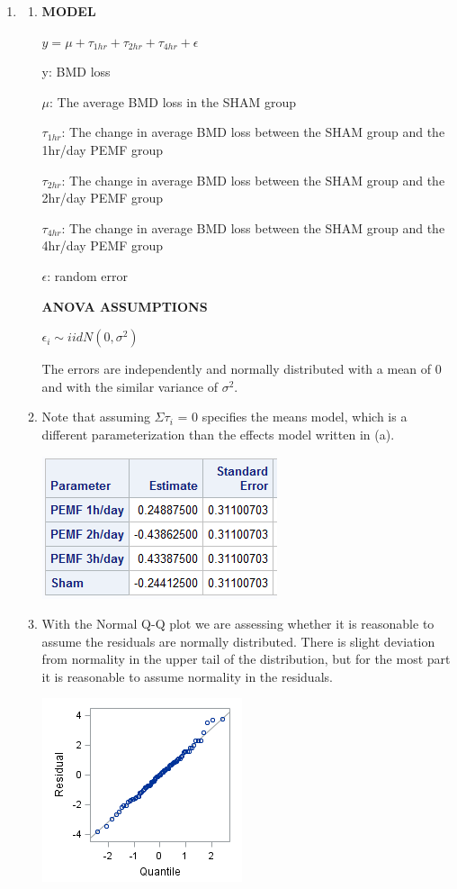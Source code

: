 \documentclass{article}\usepackage[]{graphicx}\usepackage[]{color}
\begin{document}
\begin{enumerate}
\newpage

\item %
\begin{enumerate}
\item %

{\bf MODEL}

$y = \mu + \tau_{1hr} + \tau_{2hr} + \tau_{4hr} + \epsilon$

y: BMD loss

$\mu$: The average BMD loss in the SHAM group

$\tau_{1hr}$: The change in average BMD loss between the SHAM group and the 1hr/day PEMF group

$\tau_{2hr}$: The change in average BMD loss between the SHAM group and the 2hr/day PEMF group

$\tau_{4hr}$: The change in average BMD loss between the SHAM group and the 4hr/day PEMF group

$\epsilon$: random error

{\bf ANOVA ASSUMPTIONS}

$\epsilon_{i} \sim iid N(0,\sigma^{2})$

The errors are independently and normally distributed with a mean of 0 and with the similar variance of $\sigma^{2}$.

\item %

Note that assuming $\Sigma \tau_{i}$ = 0 specifies the means model, which is a different parameterization than the effects model written in (a).


\includegraphics{estse4b}

\item %

With the Normal Q-Q plot we are assessing whether it is reasonable to assume the residuals are normally distributed. There is slight deviation from normality in the upper tail of the distribution, but for the most part it is reasonable to assume normality in the residuals.

\includegraphics{normqq4c}


\end{enumerate}
\end{enumerate}
\end{document}
